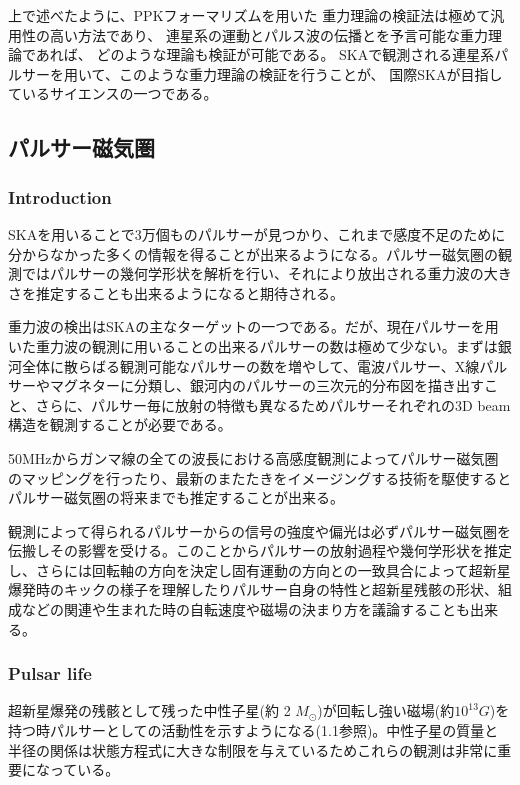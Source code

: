 上で述べたように、PPKフォーマリズムを用いた
重力理論の検証法は極めて汎用性の高い方法であり、
連星系の運動とパルス波の伝播とを予言可能な重力理論であれば、
どのような理論も検証が可能である。
SKAで観測される連星系パルサーを用いて、このような重力理論の検証を行うことが、
国際SKAが目指しているサイエンスの一つである。



\subsection{パルサー磁気圏}
\subsubsection{Introduction}
SKAを用いることで3万個ものパルサーが見つかり、これまで感度不足のために分からなかった多くの情報を得ることが出来るようになる。パルサー磁気圏の観測ではパルサーの幾何学形状を解析を行い、それにより放出される重力波の大きさを推定することも出来るようになると期待される。

重力波の検出はSKAの主なターゲットの一つである。だが、現在パルサーを用いた重力波の観測に用いることの出来るパルサーの数は極めて少ない。まずは銀河全体に散らばる観測可能なパルサーの数を増やして、電波パルサー、X線パルサーやマグネターに分類し、銀河内のパルサーの三次元的分布図を描き出すこと、さらに、パルサー毎に放射の特徴も異なるためパルサーそれぞれの3D beam構造を観測することが必要である。

50MHzからガンマ線の全ての波長における高感度観測によってパルサー磁気圏のマッピングを行ったり、最新のまたたきをイメージングする技術を駆使するとパルサー磁気圏の将来までも推定することが出来る。

観測によって得られるパルサーからの信号の強度や偏光は必ずパルサー磁気圏を伝搬しその影響を受ける。このことからパルサーの放射過程や幾何学形状を推定し、さらには回転軸の方向を決定し固有運動の方向との一致具合によって超新星爆発時のキックの様子を理解したりパルサー自身の特性と超新星残骸の形状、組成などの関連や生まれた時の自転速度や磁場の決まり方を議論することも出来る。

\subsubsection{Pulsar life}
超新星爆発の残骸として残った中性子星(約 2 $M_{\odot}$)が回転し強い磁場(約$10^{13}G$)を持つ時パルサーとしての活動性を示すようになる(1.1参照)。中性子星の質量と半径の関係は状態方程式に大きな制限を与えているためこれらの観測は非常に重要になっている。

